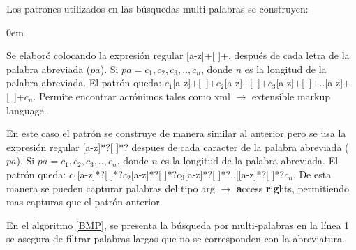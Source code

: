 \documentclass[a4paper,12pt]{report}
\begin{document}
Los patrones utilizados en las búsquedas multi-palabras se construyen:

\begin{description}
\itemsep0em%
\item[Patrón acrónimo:] Se elaboró colocando la expresión regular [a-z]+[ ]+, después de cada letra de la palabra abreviada ($pa$). Si $pa=c_{1},c_{2},c_{3},..,c_{n}$, donde $n$ es la longitud de la palabra abreviada. El patrón queda: \mbox{$c_{1}$[a-z]+[ ]+$c_{2}$[a-z]+[ ]+$c_{3}$[a-z]+[ ]+..[a-z]+[ ]+$c_{n}$}. Permite encontrar acrónimos tales como \textsf{xml} $\rightarrow$ \textsf{extensible markup language}.

\item[Patrón de Combinación de Palabras:] En este caso el patrón se construye de manera similar al anterior pero se usa la expresión regular [a-z]*?[ ]*? despues de cada caracter de la palabra abreviada ($pa$). Si $pa=c_{1},c_{2},c_{3},..,c_{n}$, donde $n$ es la longitud de la palabra abreviada. El patrón queda: $c_{1}$[a-z]*?[ ]*?$c_{2}$[a-z]*?[ ]*?$c_{3}$[a-z]*?[ ]*?..[[a-z]*?[ ]*?$c_{n}$. De esta manera se pueden capturar palabras del tipo \textsf{arg} $\rightarrow$ \textsf{\textbf{a}ccess \textbf{r}i\textbf{g}hts}, permitiendo mas capturas que el patrón anterior.
\end{description}



En el algoritmo \ref{BMP}, se presenta la búsqueda por multi-palabras\cite{EZH08} en la línea 1 se asegura de filtrar palabras largas que no se corresponden con la abreviatura.
\end{document}
